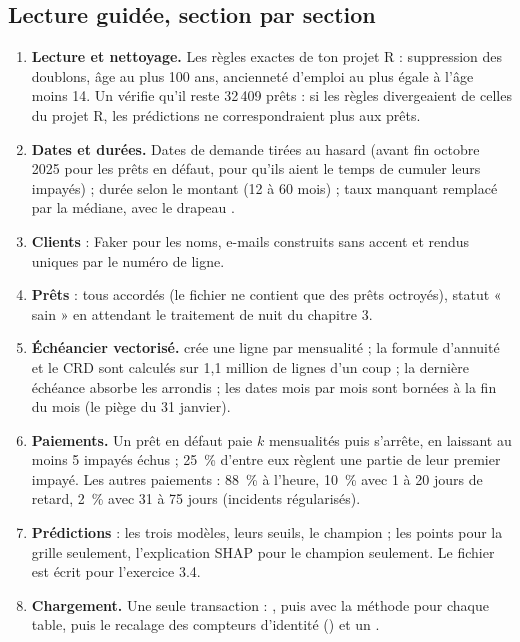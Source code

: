 \subsection{Lecture guidée, section par section}

\begin{enumerate}[leftmargin=1.6em, itemsep=0.4em]
\item \textbf{Lecture et nettoyage.} Les règles exactes de ton projet R : suppression des doublons, âge
au plus 100 ans, ancienneté d'emploi au plus égale à l'âge moins 14. Un  vérifie qu'il
reste 32\,409 prêts : si les règles divergeaient de celles du projet R, les prédictions ne
correspondraient plus aux prêts.
\item \textbf{Dates et durées.} Dates de demande tirées au hasard (avant fin octobre 2025 pour les prêts en
défaut, pour qu'ils aient le temps de cumuler leurs impayés) ; durée selon le montant (12 à 60 mois) ;
taux manquant remplacé par la médiane, avec le drapeau .
\item \textbf{Clients} : Faker pour les noms, e-mails construits sans accent et rendus uniques par le
numéro de ligne.
\item \textbf{Prêts} : tous accordés (le fichier ne contient que des prêts octroyés), statut « sain » en
attendant le traitement de nuit du chapitre 3.
\item \textbf{Échéancier vectorisé.}  crée une ligne par mensualité ; la formule
d'annuité et le CRD sont calculés sur 1,1 million de lignes d'un coup ; la dernière échéance absorbe
les arrondis ; les dates mois par mois sont bornées à la fin du mois (le piège du 31 janvier).
\item \textbf{Paiements.} Un prêt en défaut paie $k$ mensualités puis s'arrête, en laissant au moins 5
impayés échus ; 25~\% d'entre eux règlent une partie de leur premier impayé. Les autres paiements :
88~\% à l'heure, 10~\% avec 1 à 20 jours de retard, 2~\% avec 31 à 75 jours (incidents régularisés).
\item \textbf{Prédictions} : les trois modèles, leurs seuils, le champion ; les points pour la grille
seulement, l'explication SHAP pour le champion seulement. Le fichier  est écrit
pour l'exercice 3.4.
\item \textbf{Chargement.} Une seule transaction : , puis
 avec la méthode  pour chaque table, puis le recalage des compteurs d'identité
() et un .
\end{enumerate}

